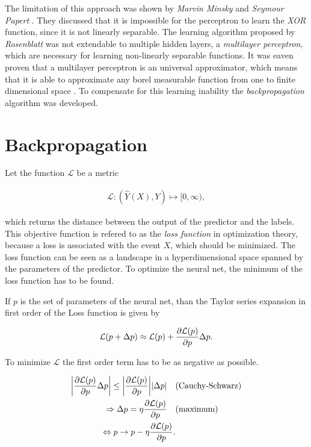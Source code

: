\documentclass[12pt, a4paper]{thesis}
\begin{document}
The limitation of this approach was shown by \emph{Marvin Minsky} and \emph{Seymour
Papert} \cite{newell69_percep}. They discussed that it is impossible for the
perceptron to learn the \emph{XOR} function, since it is not linearly separable. The
learning algorithm proposed by \emph{Rosenblatt} was not extendable to multiple
hidden layers, a \emph{multilayer perceptron}, which are necessary for learning
non-linearly separable functions. It was eaven proven that a multilayer
perceptron is an universal approximator, which means that it is able to
approximate any borel measurable function from one to finite dimensional space
\cite{hornik89}. To compensate for this learning inability the \emph{backpropagation}
algorithm was developed.

\section{Backpropagation}
\label{sec:org8847e0d}

Let the function \(\mathcal{L}\) be a metric

\begin{align}
\mathcal{L}: \left(\hat{Y}(X), Y\right) \mapsto [0, \infty),
\end{align}

which returns the distance between the output of the predictor and the
labels. This objective function is refered to as the \emph{loss function} in
optimization theory, because a loss is associated with the event \(X\), which
should be minimized.  The loss function can be seen as a landscape in a
hyperdimensional space spanned by the parameters of the predictor. To optimize
the neural net, the minimum of the loss function has to be found.


If \(p\) is the set of parameters of the neural net, than the Taylor series
expansion in first order of the Loss function is given by

\begin{align}
\mathcal{L}(p + \Delta p) \approx \mathcal{L}(p) + \pdv{\mathcal{L}(p)}{p} \Delta p.
\end{align}

To minimize \(\mathcal{L}\) the first order term has to be as negative as possible. 

\begin{align}
\abs{\pdv{\mathcal{L}(p)}{p} \Delta p} \leq \abs{\pdv{\mathcal{L}(p)}{p}} \abs{\Delta p} \quad &(\text{Cauchy-Schwarz}) \\
\Rightarrow \Delta p = \eta \pdv{\mathcal{L}(p)}{p} \quad &(\text{maximum})\\
\Leftrightarrow p \rightarrow p - \eta \pdv{\mathcal{L}(p)}{p}.
\end{align}
\end{document}
